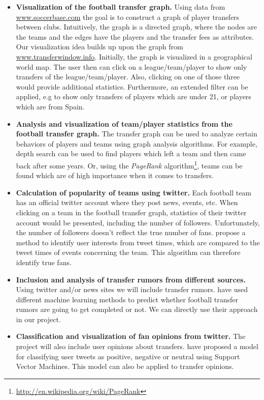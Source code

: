 \documentclass{article}
\begin{document}
\begin{itemize}
	\item \textbf{Visualization of the football transfer graph.} Using data from \url{www.soccerbase.com} the goal is to construct a graph of player transfers between clubs. Intuitively, the graph is a directed graph, where the nodes are the teams and the edges have the players and the transfer fees as attributes. Our visualization idea builds up upon the graph from \url{www.transferwindow.info}. Initially, the graph is visualized in a geographical world map. The user then can click on a league/team/player to show only transfers of the league/team/player. Also, clicking on one of those three would provide additional statistics. Furthermore, an extended filter can be applied, e.g to show only transfers of players which are under 21, or players which are from Spain.
	
	\item \textbf{Analysis and visualization of team/player statistics from the football transfer graph.} The transfer graph can be used to analyze certain behaviors of players and teams using graph analysis algorithms. For example, depth search can be used to find players which left a team and then came back after some years. Or, using the \emph{PageRank} algorithm\footnote{\url{http://en.wikipedia.org/wiki/PageRank}}, teams can be found which are of high importance when it comes to transfers.
	
	\item \textbf{Calculation of popularity of teams using twitter.} Each football team has an official twitter account where they post news, events, etc. When clicking on a team in the football transfer graph, statistics of their twitter account would be presented, including the number of followers. Unfortunately, the number of followers doesn't reflect the true number of fans. \cite{Ramasamy:2013:IUI:2512938.2512960} propose a method to identify user interests from tweet times, which are compared to the tweet times of events concerning the team. This algorithm can therefore identify true fans.
	
	\item \textbf{Inclusion and analysis of transfer rumors from different sources.} Using twitter and/or news sites we will include transfer rumors. \cite{Kunneman+12} have used different machine learning methods to predict whether football transfer rumors are going to get completed or not. We can directly use their approach in our project.
	
	\item \textbf{Classification and visualization of fan opinions from twitter.} The project will also include user opinions about transfers. \cite{Shrivatava2014} have proposed a model for classifying user tweets as positive, negative or neutral using Support Vector Machines. This model can also be applied to transfer opinions.
\end{itemize}
\end{document}

